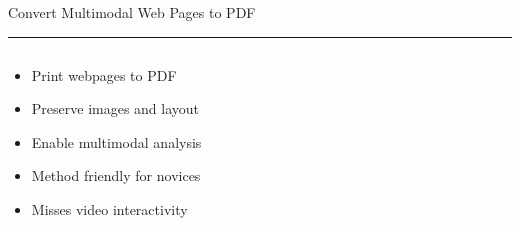\documentclass[aspectratio=169]{beamer}
\newcommand{\TitleFont}{\rmfamily}
\begin{document}
\begin{frame}[t]{}
  \vspace*{0.5cm}
  {\TitleFont\fontsize{18}{22}\selectfont\color{LUBronze}Convert Multimodal Web Pages to PDF\par}
  \vspace{0.3em}
  {\color{LUBronze}\rule{\linewidth}{0.8pt}}\par
  \vspace{0.2cm}
  \begin{columns}[t]
    \begin{column}[t]{0.45\textwidth}
      \vspace*{0pt}
      \begin{itemize}\setlength\itemsep{0.65em}
        \item Print webpages to PDF
        \item Preserve images and layout
        \item Enable multimodal analysis
        \item Method friendly for novices
        \item Misses video interactivity
      \end{itemize}
    \end{column}
  \end{columns}
\end{frame}
\end{document}
